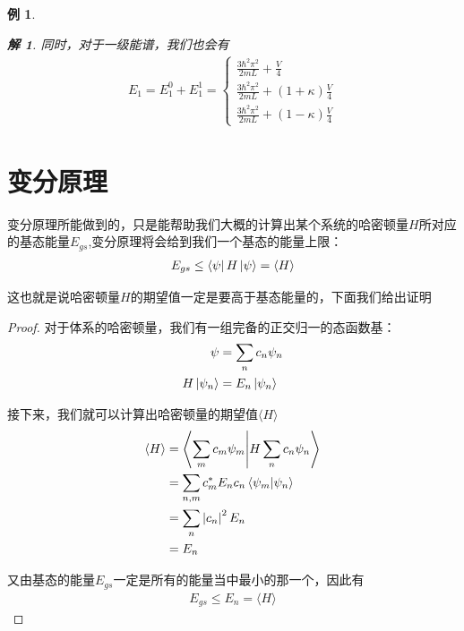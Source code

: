 \documentclass{article}
\newtheorem{example}{例}
\newtheorem{solution}{解}
\newcommand{\expectation}[1]{\langle #1 \rangle}
\begin{document}
\begin{example}
\begin{solution}
    同时，对于一级能谱，我们也会有
    \begin{align*}
        E_1=E_1^0+E_1^1=
        \begin{cases}
            \frac{3\hbar^2\pi^2}{2mL}+\frac{V}{4}\\
            \frac{3\hbar^2\pi^2}{2mL}+(1+\kappa)\frac{V}{4}\\
            \frac{3\hbar^2\pi^2}{2mL}+(1-\kappa)\frac{V}{4}
        \end{cases}
    \end{align*}
    \end{solution}
\end{example}

\section{变分原理}
变分原理所能做到的，只是能帮助我们大概的计算出某个系统的哈密顿量$H$所对应的基态能量$E_{gs}$,变分原理将会给到我们一个基态的能量上限：
\begin{align*}
    E_{gs}\leq\bra{\psi}H\ket{\psi}=\expectation{H}
\end{align*}

这也就是说哈密顿量$H$的期望值一定是要高于基态能量的，下面我们给出证明
\begin{proof}
    对于体系的哈密顿量，我们有一组完备的正交归一的态函数基：
    \begin{align*}
        \psi&=\sum_{n}c_n\psi_n\\
        H\ket{\psi_n}&=E_n\ket{\psi_n}
    \end{align*}

    接下来，我们就可以计算出哈密顿量的期望值$\expectation{H}$
    \begin{align*}
        \expectation{H}&=\braket{\sum_mc_m\psi_m}{H\sum_nc_n\psi_n}\\
        &=\sum_{n,m}c_m^*E_nc_n\braket{\psi_m}{\psi_n}\\
        &=\sum_n\left|c_n\right|^2E_n\\
        &=E_n
    \end{align*}

    又由基态的能量$E_{gs}$一定是所有的能量当中最小的那一个，因此有
    \begin{align*}
        E_{gs}\leq E_n=\expectation{H}
    \end{align*}
\end{proof}
\end{document}
